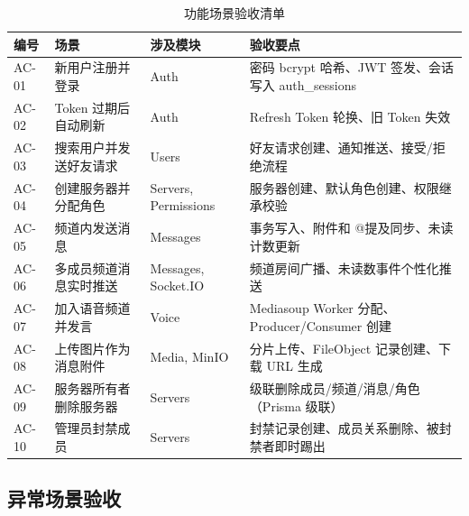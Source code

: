 \begin{table}[H]
\centering
\caption{功能场景验收清单}
\begin{tabularx}{\textwidth}{L{1.0cm}L{3.0cm}L{2.5cm}Y}
\toprule
\textbf{编号} & \textbf{场景} & \textbf{涉及模块} & \textbf{验收要点} \\
\midrule
AC-01 & 新用户注册并登录 & Auth & 密码 bcrypt 哈希、JWT 签发、会话写入 auth\_sessions \\
AC-02 & Token 过期后自动刷新 & Auth & Refresh Token 轮换、旧 Token 失效 \\
AC-03 & 搜索用户并发送好友请求 & Users & 好友请求创建、通知推送、接受/拒绝流程 \\
AC-04 & 创建服务器并分配角色 & Servers, Permissions & 服务器创建、默认角色创建、权限继承校验 \\
AC-05 & 频道内发送消息 & Messages & 事务写入、附件和 @提及同步、未读计数更新 \\
AC-06 & 多成员频道消息实时推送 & Messages, Socket.IO & 频道房间广播、未读数事件个性化推送 \\
AC-07 & 加入语音频道并发言 & Voice & Mediasoup Worker 分配、Producer/Consumer 创建 \\
AC-08 & 上传图片作为消息附件 & Media, MinIO & 分片上传、FileObject 记录创建、下载 URL 生成 \\
AC-09 & 服务器所有者删除服务器 & Servers & 级联删除成员/频道/消息/角色（Prisma 级联） \\
AC-10 & 管理员封禁成员 & Servers & 封禁记录创建、成员关系删除、被封禁者即时踢出 \\
\bottomrule
\end{tabularx}
\label{tab:accept-scenarios}
\end{table}

\subsection{异常场景验收}

